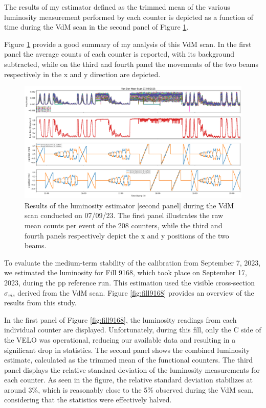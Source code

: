 The results of my estimator defined as the trimmed mean of the various luminosity measurement performed by each counter is depicted as a function of time during the VdM scan in the second panel of Figure \ref{fig:lumi_result_all}. 

Figure \ref{fig:lumi_result_all} provide a good summary of my analysis of this VdM scan. In the first panel the average counts of each counter is reported, with its background subtracted, while on the third and fourth panel the movements of the two beams respectively in the x and y direction are depicted.

\begin{figure}
    \centering
    \includegraphics[width=\textwidth]{figures/lumi_plot.png}
    \caption{Results of the luminosity estimator [second panel] during the VdM scan conducted on 07/09/23.
The first panel illustrates the raw mean counts per event of the 208 counters, while the third and fourth
panels respectively depict the x and y positions of the two beams.}
    \label{fig:lumi_result_all}
\end{figure}


To evaluate the medium-term stability of the calibration from September 7, 2023, we estimated the luminosity for Fill 9168, which took place on September 17, 2023, during the pp reference run. This estimation used the visible cross-section $\sigma_{vis}$ derived from the VdM scan. Figure \ref{fig:fill9168} provides an overview of the results from this study.

In the first panel of Figure \ref{fig:fill9168}, the luminosity readings from each individual counter are displayed. Unfortunately, during this fill, only the C side of the VELO was operational, reducing our available data and resulting in a significant drop in statistics. The second panel shows the combined luminosity estimate, calculated as the trimmed mean of the functional counters. The third panel displays the relative standard deviation of the luminosity measurements for each counter. As seen in the figure, the relative standard deviation stabilizes at around 3\%, which is reasonably close to the 5\% observed during the VdM scan, considering that the statistics were effectively halved.

